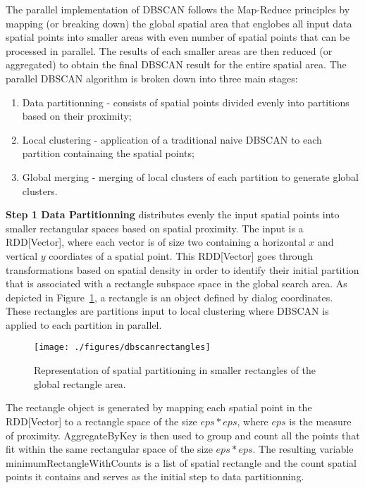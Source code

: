 The parallel implementation of DBSCAN follows the Map-Reduce principles by mapping (or breaking down) the global spatial area that englobes all input data spatial points into smaller areas with even number of spatial points that can be processed in parallel. The results of each smaller areas are then reduced (or aggregated) to obtain the final DBSCAN result for the entire spatial area. The parallel DBSCAN algorithm is broken down into three main stages: 
\begin{enumerate}
	\item Data partitionning - consists of spatial points divided evenly into partitions based on their proximity;
	\item Local clustering - application of a traditional naive DBSCAN to each partition containaing the spatial points;
	\item Global merging - merging of local clusters of each partition to generate global clusters.
\end{enumerate}

\textbf{Step 1 Data Partitionning} distributes evenly the input spatial points into smaller rectangular spaces based on spatial proximity. The input is a \textsf{RDD[Vector]}, where each vector is of size two containing a horizontal $x$ and vertical $y$ coordiates of a spatial point. This \textsf{RDD[Vector]} goes through transformations based on spatial density in order to identify their initial partition that is associated with a rectangle subspace space in the global search area. As depicted in Figure~\ref{fig:dbscanrectangles}, a rectangle is an object defined by dialog coordinates. These rectangles are partitions  input to local clustering where DBSCAN is applied to each partition in parallel.

\begin{figure}
    \centering
	\texttt{[image: ./figures/dbscanrectangles]}
	\caption{Representation of spatial partitioning in smaller rectangles of the global rectangle area.}
	\label{fig:dbscanrectangles}
\end{figure}


The rectangle object is generated by mapping each spatial point in the \textsf{RDD[Vector]} to a rectangle space of the size $eps * eps$, where $eps$ is the measure of proximity. \textsf{AggregateByKey} is then used to group and count all the points that fit within the same rectangular space of the size $eps * eps$. The resulting variable \textsf{minimumRectangleWithCounts} is a list of spatial rectangle and the count spatial points it contains and serves as the initial step to data partitionning.

